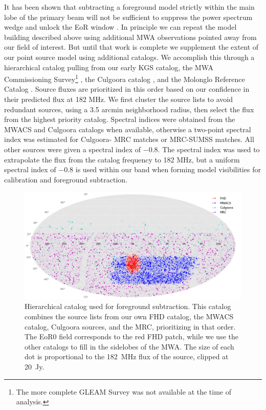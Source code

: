 \documentclass[iop]{emulateapj}
\begin{document}
It has been shown that subtracting a foreground model strictly within the main lobe of the 
primary beam will not be sufficient to suppress the power spectrum wedge and unlock the 
EoR window \citep{Pober:2016, Thyagarajan:2015, Thyagarajan:2015b}. In principle we 
can repeat the model building described above using additional MWA observations pointed 
away from our field of interest. But until that work is complete we supplement the extent of 
our point source model using additional catalogs. We accomplish this through a hierarchical 
catalog pulling from our early KGS catalog, the MWA Commissioning Survey\footnote{The 
more complete GLEAM Survey \citep[][Hurley-Walker et al., in collaboration review]
{Wayth:2015} was not available at the time of analysis.} \citep[MWACS, ][]
{Hurley-Walker:2014}, the Culgoora catalog \citep{Slee:1977}, and the Molonglo Reference Catalog 
\citep[MRC, ][]{Large:1981}. Source fluxes are prioritized in this order based on our 
confidence in their predicted flux at 182 MHz. We first cluster the source lists to avoid 
redundant sources, using a 3.5 arcmin neighborhood radius, then select the flux from the 
highest priority catalog. Spectral indices were obtained from the MWACS and Culgoora 
catalogs when available, otherwise a two-point spectral index was estimated for Culgoora-
MRC matches or MRC-SUMSS matches. All other sources were given a spectral index of 
$-0.8$. The spectral index was used to extrapolate the flux from the catalog frequency to 
182 MHz, but a uniform spectral index of $-0.8$ is used within our band when forming 
model visibilities for calibration and foreground subtraction.

\begin{figure}
\begin{center}
\includegraphics[width=\textwidth]{master_catalog.png}
\caption{
Hierarchical catalog used for foreground subtraction. This catalog combines the source lists 
from our own FHD catalog, the MWACS catalog, Culgoora sources, and the MRC, 
prioritizing in that order. The EoR0 field corresponds to the red FHD patch, while we use the 
other catalogs to fill in the sidelobes of the MWA. The size of each dot is proportional to the 
182~MHz flux of the source, clipped at 20~Jy.
\label{fig:master_catalog}
}
\end{center}
\end{figure}
\end{document}

